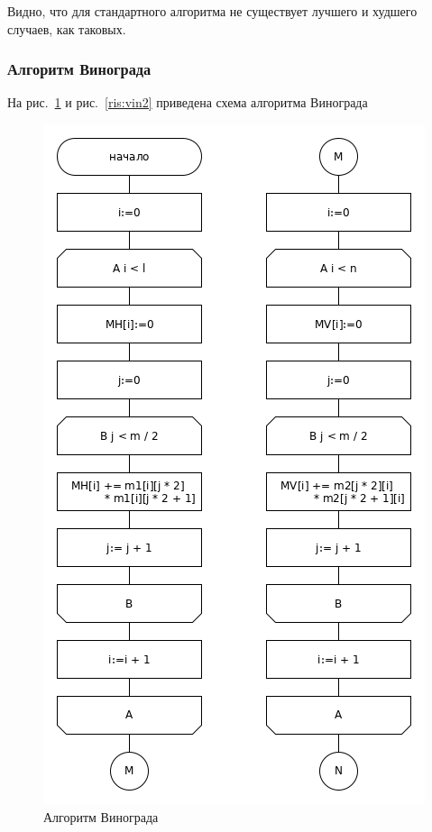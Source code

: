 \documentclass[a4paper,12pt]{article}
\begin{document}
	Видно, что для стандартного алгоритма не существует лучшего и худшего случаев, как таковых.
    \newpage
    
    \afterpage{\FloatBarrier}
    \subsubsection{Алгоритм Винограда}
    
    На рис.~\ref{ris:vin1} и рис.~\ref{ris:vin2} приведена схема алгоритма Винограда
	 		\begin{figure}[H]
	 			\centering
	 			{
	 				\includegraphics[scale=0.51]{vinograd1.png}
	 				\caption{\label{ris:vin1}Алгоритм Винограда}	
	 			}
	 		\end{figure}	
\end{document}
